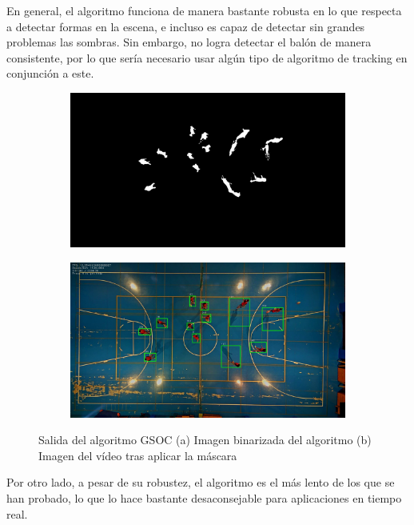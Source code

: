 En general, el algoritmo funciona de manera bastante robusta en lo que respecta a detectar formas en la escena, e incluso es capaz de detectar sin grandes problemas las sombras. Sin embargo, no logra detectar el balón de manera consistente, por lo que sería necesario usar algún tipo de algoritmo de tracking en conjunción a este.

\begin{figure}
\begin{subfigure}{.5\textwidth}
  \centering
  \includegraphics[width=.9\linewidth]{images/GSOCsub}
  \caption { }
  \label{fig:GSOC1a}
\end{subfigure}%
\begin{subfigure}{.5\textwidth}
  \centering
  \includegraphics[width=.9\linewidth]{images/GSOC}
  \caption { }
  \label{fig:GSOC1b}
\end{subfigure}
\caption{Salida del algoritmo GSOC (a) Imagen binarizada del algoritmo (b) Imagen del vídeo tras aplicar la máscara }
\label{fig:GSOC}
\end{figure}

Por otro lado, a pesar de su robustez, el algoritmo es el más lento de los que se han probado, lo que lo hace bastante desaconsejable para aplicaciones en tiempo real.

